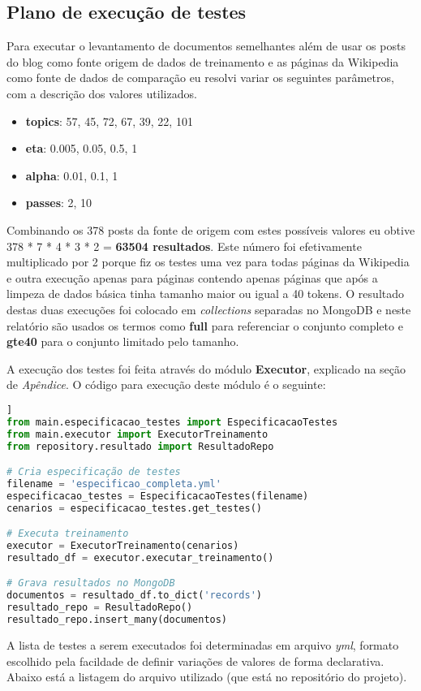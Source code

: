 \subsection{Plano de execução de testes}

Para executar o levantamento de documentos semelhantes além de usar os posts do blog como fonte origem de dados de treinamento e as páginas da 
Wikipedia como fonte de dados de comparação eu resolvi variar os seguintes parâmetros, com a descrição dos valores utilizados.

\begin{itemize}
    \item \textbf{topics}: 57, 45, 72, 67, 39, 22, 101
    \item \textbf{eta}: 0.005, 0.05, 0.5, 1
    \item \textbf{alpha}: 0.01, 0.1, 1
    \item \textbf{passes}: 2, 10
\end{itemize}

Combinando os 378 posts da fonte de origem com estes possíveis valores eu obtive 378 * 7 * 4 * 3 * 2 = \textbf{63504 resultados}. Este número 
foi efetivamente multiplicado por 2 porque fiz os testes uma vez para todas páginas da Wikipedia e outra execução apenas para páginas contendo 
apenas páginas que após a limpeza de dados básica tinha tamanho maior ou igual a 40 tokens. O resultado destas duas execuções foi colocado 
em \textit{collections} separadas no MongoDB e neste relatório são usados os termos como \textbf{full} para referenciar o conjunto completo e 
\textbf{gte40} para o conjunto limitado pelo tamanho.

A execução dos testes foi feita através do módulo \textbf{Executor}, explicado na seção de \textit{Apêndice}. O código para execução deste 
módulo é o seguinte:

\begin{lstlisting}[language=Python, style=mystyle, frame=lines, caption=Código fonte: Treinamento de modelo usando LDA]]
from main.especificacao_testes import EspecificacaoTestes
from main.executor import ExecutorTreinamento
from repository.resultado import ResultadoRepo

# Cria especificação de testes
filename = 'especificao_completa.yml'
especificacao_testes = EspecificacaoTestes(filename)
cenarios = especificacao_testes.get_testes()

# Executa treinamento
executor = ExecutorTreinamento(cenarios)
resultado_df = executor.executar_treinamento()

# Grava resultados no MongoDB
documentos = resultado_df.to_dict('records')
resultado_repo = ResultadoRepo()
resultado_repo.insert_many(documentos)
\end{lstlisting}

A lista de testes a serem executados foi determinadas em arquivo \textit{yml}, formato escolhido pela facildade de definir variações de valores
de forma declarativa. Abaixo está a listagem do arquivo utilizado (que está no repositório do projeto).

